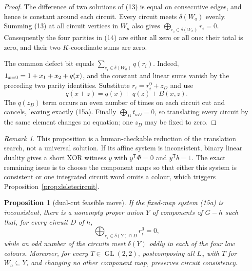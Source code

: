 \documentclass[11pt]{article}
\newtheorem{proposition}[theorem]{Proposition}
\theoremstyle{definition}
\theoremstyle{remark}
\newtheorem{remark}[theorem]{Remark}
\begin{document}
\begin{proof}
The difference of two solutions of (13) is equal on consecutive edges,
and hence is constant around each circuit.  Every circuit meets
\(\delta(W_a)\) evenly.  Summing (13) at all circuit vertices in \(W_a\)
also gives
\(\bigoplus_{e_i\in\delta(W_a)}r_i=0\).
Consequently the four parities in (14) are either all zero or all one:
their total is zero, and their two \(K\)-coordinate sums are zero.

The common defect bit equals
\(\sum_{e_i\in\delta(W_a)}q(r_i)\).  Indeed,
\({\bf1}_{x=0}=1+x_1+x_2+q(x)\), and the constant and linear sums vanish
by the preceding two parity identities.  Substitute
\(r_i=r_i^0+z_D\) and use
\[
 q(x+z)=q(x)+q(z)+B(x,z).
\]
The \(q(z_D)\) term occurs an even number of times on each circuit cut
and cancels, leaving exactly (15a).  Finally
\(\bigoplus_Dt_{aD}=0\), so translating every circuit by the same element
changes no equation; one \(z_D\) may be fixed to zero.
\end{proof}

\begin{remark}
This proposition is a human-checkable reduction of the translation search,
not a universal solution.  If its affine system is inconsistent, binary
linear duality gives a short XOR witness \(y\) with
\(y^{\mathsf T}\Phi=0\) and \(y^{\mathsf T}b=1\).
The exact remaining issue is to choose the component maps so that either
this system is consistent or one integrated circuit word omits a colour,
which triggers Proposition~\ref{prop:deletecircuit}.
\end{remark}

\begin{proposition}[dual-cut feasible move]\label{prop:dualcut}
If the fixed-map system (15a) is inconsistent, there is a nonempty
proper union \(Y\) of components of \(G-h\) such that, for every circuit
\(D\) of \(h\),
\[
                    \bigoplus_{e_i\in\delta(Y)\cap D}r_i^0=0,
                                                               \tag{15b}
\]
while an odd number of the circuits meet \(\delta(Y)\) oddly in each
of the four low colours.  Moreover, for every \(T\in\operatorname{GL}(2,2)\),
postcomposing all \(L_a\) with \(T\) for \(W_a\subseteq Y\), and changing
no other component map, preserves circuit consistency.
\end{proposition}
\end{document}
